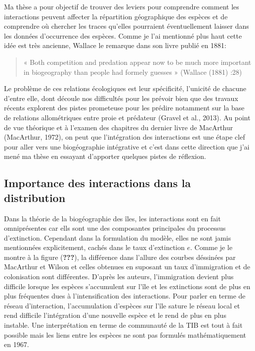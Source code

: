 Ma thèse a pour objectif de trouver des leviers pour comprendre comment
les interactions peuvent affecter la répartition géographique des
espèces et de comprendre où chercher les traces qu'elles pourraient
éventuellement laisser dans les données d'occurrence des espèces. Comme
je l'ai mentionné plus haut cette idée est très ancienne, Wallace le
remarque dans son livre publié en 1881:

\begin{quote}
« Both competition and predation appear now to be much more important in
biogeography than people had formely guesses » (Wallace (1881) :28)
\end{quote}

Le problème de ces relations écologiques est leur spécificité, l'unicité
de chacune d'entre elle, dont découle nos difficultés pour les prévoir
bien que des travaux récents explorent des pistes prometeuse pour les
prédire notamment sur la base de relations allométriques entre proie et
prédateur (Gravel et al., 2013). Au point de vue théorique et à l'examen
des chapitres du dernier livre de MacArthur (MacArthur, 1972), on peut
que l'intégration des interactions est une étape clef pour aller vers
une biogéographie intégrative et c'est dans cette direction que j'ai
mené ma thèse en essayant d'apporter quelques pistes de réflexion.

\subsection*{Importance des interactions dans la
distribution}\label{importance-des-interactions-dans-la-distribution}

Dans la théorie de la biogéographie des îles, les interactions sont en
fait omniprésentes car ells sont une des composantes principales du
processus d'extinction. Cependant dans la formulation du modèle, elles
ne sont jamis mentionnées explicitement, cachés dans le taux
d'extinction \(e\). Comme je le montre à la figure ({\textbf{???}}), la
différence dans l'allure des courbes déssinées par MacArthur et Wilson
et celles obtenues en suposant un taux d'immigration et de colonisation
sont différentes. D'après les auteurs, l'immigration devient plus
difficile lorsque les espèces s'accumulent sur l'île et les extinctions
sont de plus en plus fréquentes dues à l'intensification des
interactions. Pour parler en terme de réseau d'interaction,
l'accumulation d'espèces sur l'île sature le réseau local et rend
difficile l'intégration d'une nouvelle espèce et le rend de plus en plus
instable. Une interprétation en terme de communauté de la TIB est tout à
fait possible mais les liens entre les espèces ne sont pas formulés
mathématiquement en 1967.

